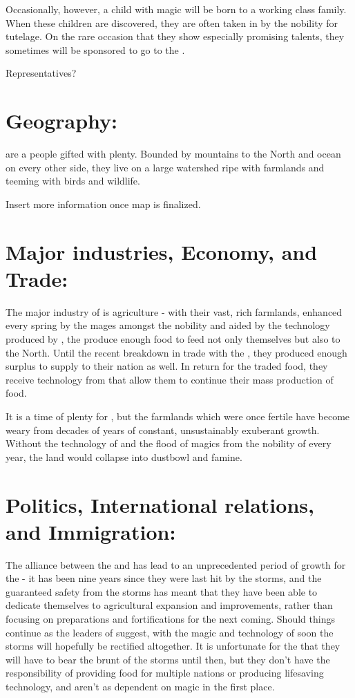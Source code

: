 \documentclass[blue]{GL2020}
\begin{document}
Occasionally, however, a child with magic will be born to a working class family.  When these children are discovered, they are often taken in by the nobility for tutelage.  On the rare occasion that they show especially promising talents, they sometimes will be sponsored to go to the \pSchool{}.

Representatives?

\section*{Geography:}

\pSunCh{} are a people gifted with plenty.  Bounded by mountains to the North and ocean on every other side, they live on a large watershed ripe with farmlands and teeming with birds and wildlife.  

Insert more information once map is finalized.

\section*{Major industries, Economy, and Trade:}

The major industry of \pSun{} is agriculture - with their vast, rich farmlands, enhanced every spring by the mages amongst the nobility and aided by the technology produced by \pCreators{}, the \pSunCh{} produce enough food to feed not only themselves but also  \pCreators{} to the North.  Until the recent breakdown in trade with the \pVikings{}, they produced enough surplus to supply to their nation as well.  In return for the traded food, they receive technology from \pCreators{} that allow them to continue their mass production of food.

It is a time of plenty for \pSunCh{}, but the farmlands which were once fertile have become weary from decades of years of constant, unsustainably exuberant growth.  Without the technology of \pCreators{} and the flood of magics from the nobility of \pSun{} every year, the land would collapse into dustbowl and famine.

\section*{Politics, International relations, and Immigration:}

The alliance between the \pSun{} and \pCreators{} has lead to an unprecedented period of growth for the \pSunCh{} - it has been nine years since they were last hit by the storms, and the guaranteed safety from the storms has meant that they have been able to dedicate themselves to agricultural expansion and improvements, rather than focusing on preparations and fortifications for the next coming.  Should things continue as the leaders of \pCreators{} suggest, with the magic and technology of \pCreators{} soon the storms will hopefully be rectified altogether.  It is unfortunate for the \pVikings{} that they will have to bear the brunt of the storms until then, but they don't have the responsibility of providing food for multiple nations or producing lifesaving technology, and aren't as dependent on magic in the first place.
\end{document}

